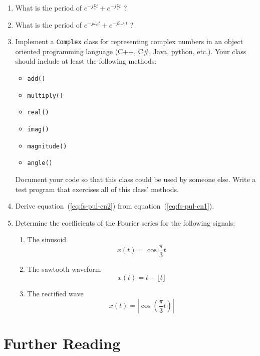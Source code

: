 \begin{enumerate}
\item What is the period of $e^{-j\frac{\pi}{4}t}+e^{-j\frac{\pi}{2}t}$ ?
\item What is the period of $e^{-j \omega_0 t}+e^{-j 5\omega_0 t}$ ?
\item Implement a  \texttt{Complex} class for representing
  complex numbers in an object oriented programming language (C++, C\#, Java, python, etc.).  Your class should include at least the following
  methods:
  \begin{itemize}
  \item \texttt{add()}
  \item \texttt{multiply()}
  \item \texttt{real()}
  \item \texttt{imag()}
  \item \texttt{magnitude()}
  \item \texttt{angle()}
  \end{itemize}

  Document your code so that this class could be used by someone else.
  Write a test program that exercises all of this class' methods. 

\item Derive equation~(\ref{eq:fs-pul-cn2}) from
  equation~(\ref{eq:fs-pul-cn1}).

\item Determine the coefficients of the Fourier series for the following signals:
\begin{enumerate}
\item The sinusoid \[x(t) = \cos \frac{\pi}{3} t\]
\item The sawtooth waveform \[ x(t) = t-\lfloor t \rfloor \]
\item The rectified wave \[ x(t) = |\cos(\frac{\pi}{3} t)| \]
\end{enumerate}
\end{enumerate}

\section{Further Reading}


